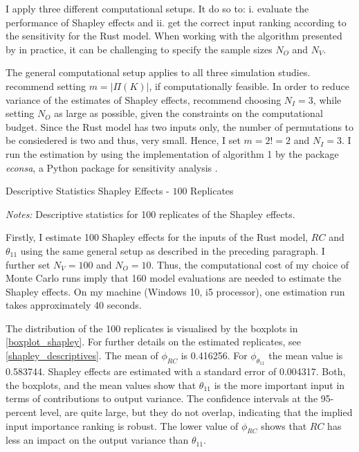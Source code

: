 I apply three different computational setups. It do so to: i. evaluate the performance of Shapley effects and ii. get the correct input ranking according to the sensitivity for the Rust model. When working with the algorithm presented by \citet{SNS16} in practice, it can be challenging to specify the sample sizes $N_O$ and $N_V$.

The general computational setup applies to all three simulation studies. \citet{SNS16} recommend setting $m=\vert \Pi(K) \vert$, if computationally feasible. In order to reduce variance of the estimates of Shapley effects, \citet{SNS16} recommend choosing $N_I=3$, while setting $N_O$ as large as possible, given the constraints on the computational budget. Since the Rust model has two inputs only, the number of permutations to be consiedered is two and thus, very small. Hence, I set $m=2!=2$ and $N_I=3$. I run the estimation by using the implementation of algorithm 1 by the package \textit{econsa}, a Python package for sensitivity analysis \citep{OSE21}.


\begin{table}[t]
	\centering
	\caption{Descriptive Statistics Shapley Effects - $100$ Replicates}
	\label{shapley_descriptives}
	\begin{threeparttable}
	\centering
	
	\begin{tablenotes}
	\small
	\item \textit{Notes:} Descriptive statistics for 100 replicates of the Shapley effects.
	\end{tablenotes}
	\end{threeparttable}
\end{table}

Firstly, I estimate 100 Shapley effects for the inputs of the Rust model, $RC$ and $\theta_{11}$ using the same general setup as described in the preceding paragraph. I further set $N_V=100$ and $N_O=10$. Thus, the computational cost of my choice of Monte Carlo runs imply that 160 model evaluations are needed to estimate the Shapley effects. On my machine (Windows 10, i5 processor), one estimation run takes approximately 40 seconds.

The distribution of the 100 replicates is visualised by the boxplots in \cref{boxplot_shapley}. For further details on the estimated replicates, see \cref{shapley_descriptives}. The mean of $\phi_{RC}$ is 0.416256. For $\phi_{\theta_{11}}$ the mean value is 0.583744. Shapley effects are estimated with a standard error of 0.004317.
Both, the boxplots, and the mean values show that $\theta_{11}$ is the more important input in terms of contributions to output variance. The confidence intervals at the 95-percent level, are quite large, but they do not overlap, indicating that the implied input importance ranking is robust. The lower value of $\phi_{RC}$ shows that $RC$ has less an impact on the output variance than $\theta_{11}$.

